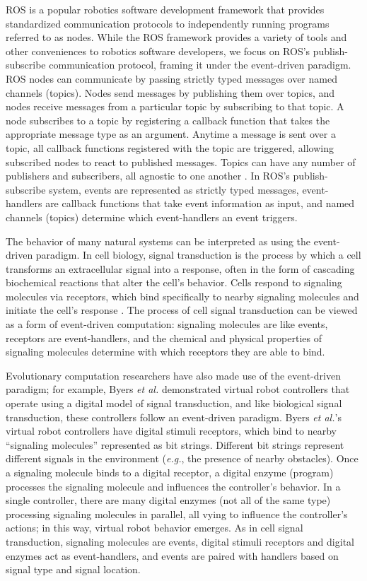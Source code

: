 ROS is a popular robotics software development framework that provides standardized communication protocols to independently running programs referred to as nodes.
While the ROS framework provides a variety of tools and other conveniences to robotics software developers, we focus on ROS's publish-subscribe communication protocol, framing it under the event-driven paradigm. 
ROS nodes can communicate by passing strictly typed messages over named channels (topics). 
Nodes send messages by publishing them over topics, and nodes receive messages from a particular topic by subscribing to that topic. 
A node subscribes to a topic by registering a callback function that takes the appropriate message type as an argument. 
Anytime a message is sent over a topic, all callback functions registered with the topic are triggered, allowing subscribed nodes to react to published messages.
Topics can have any number of publishers and subscribers, all agnostic to one another \citep{quigley_ros:_2009}. 
In ROS's publish-subscribe system, events are represented as strictly typed messages, event-handlers are callback functions that take event information as input, and named channels (topics) determine which event-handlers an event triggers. 
 
The behavior of many natural systems can be interpreted as using the event-driven paradigm. 
In cell biology, signal transduction is the process by which a cell transforms an extracellular signal into a response, often in the form of cascading biochemical reactions that alter the cell's behavior. 
Cells respond to signaling molecules via receptors, which bind specifically to nearby signaling molecules and initiate the cell's response \citep{alberts_molecular_2002}. 
The process of cell signal transduction can be viewed as a form of event-driven computation: signaling molecules are like events, receptors are event-handlers, and the chemical and physical properties of signaling molecules determine with which receptors they are able to bind. 

Evolutionary computation researchers have also made use of the event-driven paradigm; for example, Byers \textit{et al.} \citep{byers_digital_2011,byers_exploring_2012} demonstrated virtual robot controllers that operate using a digital model of signal transduction, and like biological signal transduction, these controllers follow an event-driven paradigm. 
Byers \textit{et al.}'s virtual robot controllers have digital stimuli receptors, which bind to nearby ``signaling molecules'' represented as bit strings.
Different bit strings represent different signals in the environment (\textit{e.g.}, the presence of nearby obstacles). 
Once a signaling molecule binds to a digital receptor, a digital enzyme (program) processes the signaling molecule and influences the controller's behavior. 
In a single controller, there are many digital enzymes (not all of the same type) processing signaling molecules in parallel, all vying to influence the controller's actions; in this way, virtual robot behavior emerges. 
As in cell signal transduction, signaling molecules are events, digital stimuli receptors and digital enzymes act as event-handlers, and events are paired with handlers based on signal type and signal location.